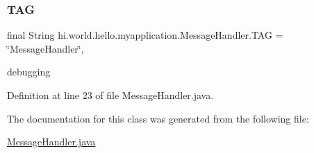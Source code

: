 \mbox{\label{classhi_1_1world_1_1hello_1_1myapplication_1_1_message_handler_a0ab36705ac35817da5d6d7d21779a318}} 
\subsubsection{\texorpdfstring{TAG}{TAG}}
{\footnotesize\ttfamily final String hi.\+world.\+hello.\+myapplication.\+Message\+Handler.\+T\+AG = \char`\"{}Message\+Handler\char`\"{}\hspace{0.3cm}{\ttfamily [static]}, {\ttfamily [private]}}



debugging 



Definition at line 23 of file Message\+Handler.\+java.



The documentation for this class was generated from the following file\+:\begin{DoxyCompactItemize}
\item 
\mbox{\hyperlink{_message_handler_8java}{Message\+Handler.\+java}}\end{DoxyCompactItemize}
